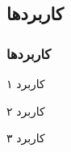 \label{study_applications}

\subsection{کاربردها}
\begin{frame}
\frametitle{کاربردها}

\begin{itemize}\raggedleft
\begin{RTLitems}
\item
کاربرد ۱
\pause
\item 
کاربرد ۲
\pause
\item 
کاربرد ۳
\pause
\end{RTLitems}
\end{itemize}

\end{frame}
